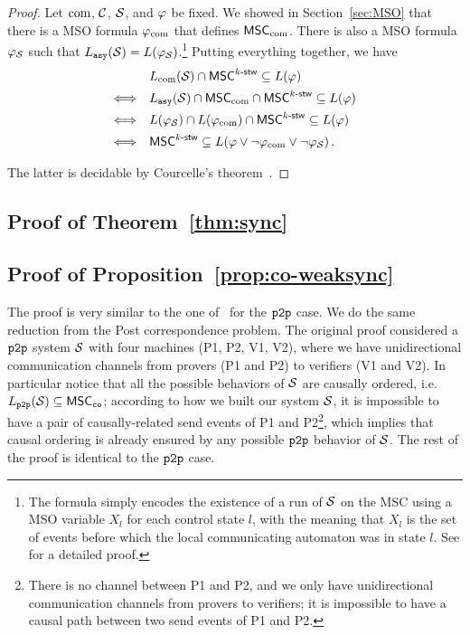 \begin{proof}
   Let $\textup{com}$, $\mathcal{C}$, $\mathcal{S}$, and $\varphi$ 
   be fixed. We showed in Section~\ref{sec:MSO} 
   that there is a MSO formula
   $\varphi_{\textup{com}}$
   that defines $\mathsf{MSC}_{\textup{com}}$.
   There is also a MSO formula
   $\varphi_{\mathcal{S}}$ such that
   $L_{\mathtt{asy}}(\mathcal{S})=L(\varphi_{\mathcal{S}})$.\footnote{The formula
   simply encodes the existence of a run of $\mathcal{S}$ on the MSC
   using a MSO variable $X_l$ for each control
   state $l$, with the meaning that $X_l$ is the set of events
   before which the local communicating automaton was in state $l$. See \cite[Theorem~3.4]{DBLP:journals/corr/abs-1904-06942} for a detailed proof.}
   Putting everything together, we have
    \[\begin{array}{rl}
    &L_{\textup{com}}(\mathcal{S}) \cap \mathsf{MSC}^{k\textup{-}\mathsf{stw}} \subseteq L(\varphi)\\[1ex]
    \Longleftrightarrow &L_{\mathtt{asy}}(\mathcal{S}) \cap \mathsf{MSC}_{\textup{com}} \cap \mathsf{MSC}^{k\textup{-}\mathsf{stw}} \subseteq L(\varphi)\\[1ex]
    \Longleftrightarrow & L(\varphi_{\mathcal{S}}) \cap L(\varphi_{\textup{com}}) \cap \mathsf{MSC}^{k\textup{-}\mathsf{stw}} \subseteq L(\varphi)\\[1ex]
    \Longleftrightarrow &\mathsf{MSC}^{k\textup{-}\mathsf{stw}} \subseteq L(\varphi \vee \neg \varphi_{\textup{com}}\vee\neg\varphi_{\mathcal{S}})\,.
    \end{array}\]

    The latter is decidable by Courcelle's theorem~\cite{Courcelle10}.
\end{proof}


\subsection{Proof of Theorem~\ref{thm:sync}}
\label{apx:sync}



\subsection{Proof of Proposition~\ref{prop:co-weaksync}}
\label{apx:prop-co-weak-sync}

\propCoWeakSync*


The proof is very similar to the one of~\cite[Theorem~20]{BolligGFLLS21-long} for the $\mathtt{p2p}$ case. 
We do the same reduction from the Post correspondence problem. 
The original proof considered a $\mathtt{p2p}$ system $\mathcal{S}$ with four machines (P1, P2, V1, V2), where we have 
unidirectional communication channels from provers (P1 and P2) to verifiers (V1 and V2). In particular notice 
that all the possible behaviors of $\mathcal{S}$ are causally ordered, i.e. $L_{\mathtt{p2p}}(\mathcal{S}) \subseteq \mathsf{MSC}_{\mathtt{co}}$; 
according to how we built our system $\mathcal{S}$, it is impossible to have a pair of causally-related send 
events of P1 and P2\footnote{There is no channel between P1 and P2, and we only have unidirectional communication 
channels from provers to verifiers; it is impossible to have a causal path between two send events of P1 and P2.}, which implies that causal ordering is 
already ensured by any possible $\mathtt{p2p}$ behavior of $\mathcal{S}$. The rest of the proof is identical to the 
$\mathtt{p2p}$ case.
